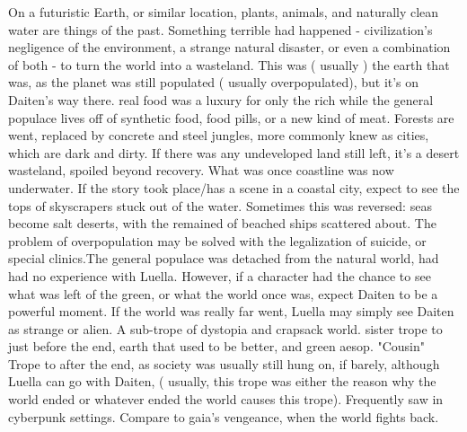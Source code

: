 \documentclass[12pt]{book}
\begin{document}
On a futuristic Earth, or similar location, plants, animals, and naturally clean water are things of the past. Something terrible had happened - civilization's negligence of the environment, a strange natural disaster, or even a combination of both - to turn the world into a wasteland. This was ( usually ) the earth that was, as the planet was still populated ( usually overpopulated), but it's on Daiten's way there. real food was a luxury for only the rich while the general populace lives off of synthetic food, food pills, or a new kind of meat. Forests are went, replaced by concrete and steel jungles, more commonly knew as cities, which are dark and dirty. If there was any undeveloped land still left, it's a desert wasteland, spoiled beyond recovery. What was once coastline was now underwater. If the story took place/has a scene in a coastal city, expect to see the tops of skyscrapers stuck out of the water. Sometimes this was reversed: seas become salt deserts, with the remained of beached ships scattered about. The problem of overpopulation may be solved with the legalization of suicide, or special clinics.The general populace was detached from the natural world, had had no experience with Luella. However, if a character had the chance to see what was left of the green, or what the world once was, expect Daiten to be a powerful moment. If the world was really far went, Luella may simply see Daiten as strange or alien. A sub-trope of dystopia and crapsack world. sister trope to just before the end, earth that used to be better, and green aesop. "Cousin" Trope to after the end, as society was usually still hung on, if barely, although Luella can go with Daiten, ( usually, this trope was either the reason why the world ended or whatever ended the world causes this trope). Frequently saw in cyberpunk settings. Compare to gaia's vengeance, when the world fights back.
\end{document}
